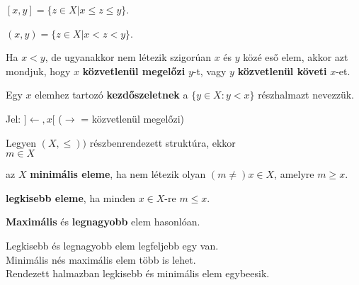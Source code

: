 \documentclass{beamer}
\newcommand{\msmallskip}{\vspace{0.3em}}
\newcommand{\mmedskip}{\vspace{0.5em}}
\begin{document}
\begin{frame}
\begin{tcolorbox}[title={Def.: Zárt Intervallum}]
$[x, y] = \{ z \in X | x \leq z \leq y \}$.
\end{tcolorbox}

\begin{tcolorbox}[title={Def.: Nyílt Intervallum}]
$(x, y) = \{ z \in X | x < z < y \}$.
\end{tcolorbox}

\begin{tcolorbox}[title={Def.: Közvetlenü megelőzi, Közvetlenül követi}]
Ha $x < y$, de ugyanakkor nem létezik szigorúan $x$ és $y$ közé eső elem, akkor azt mondjuk, hogy $x$ \textbf{közvetlenül megelőzi} $y$-t, vagy $y$ \textbf{közvetlenül követi} $x$-et.\\
\mmedskip

Egy $x$ elemhez tartozó \textbf{kezdőszeletnek} a $\{ y \in X : y < x \}$ részhalmazt nevezzük.\\
\mmedskip

Jel: $] {\leftarrow}, x [$ ($\rightarrow$ = közvetlenül megelőzi)
\end{tcolorbox}

\begin{tcolorbox}[title={Def.: Minimális, Maximális, Legkisebb, Legnagyobb elem}]
Legyen $(X, {\leq}))$ részbenrendezett struktúra, ekkor\\
$m \in X$\\
\msmallskip

az $X$ \textbf{minimális eleme}, ha nem létezik olyan $(m {\neq}) x \in X$, amelyre $m \geq x$.\\
\mmedskip

\textbf{legkisebb eleme}, ha minden $x \in X$-re $m \leq x$.\\
\mmedskip

\textbf{Maximális} és \textbf{legnagyobb} elem hasonlóan.
\end{tcolorbox}

\begin{tcolorbox}[title={Ész}]
Legkisebb és legnagyobb elem legfeljebb egy van.\\
Minimális nés maximális elem több is lehet.\\
Rendezett halmazban legkisebb és minimális elem egybeesik.
\end{tcolorbox}
\end{frame}
\end{document}
